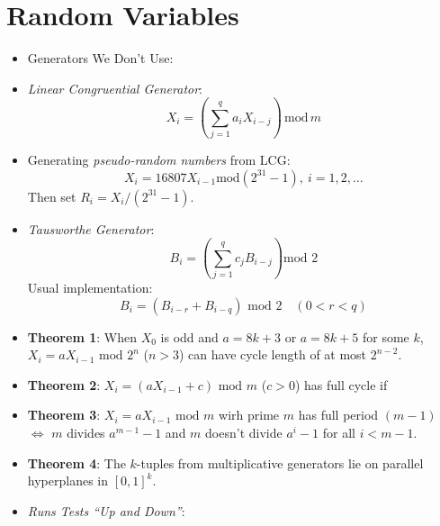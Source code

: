 \documentclass[10pt, twocolumn]{article}
\begin{document}
\section*{Random Variables}
\begin{itemize}
\item Generators We Don't Use: 
\item \emph{Linear Congruential Generator}: 
\[ X_i=(\sum_{j=1}^qa_iX_{i-j})\,\text{mod}\,m \]
\item Generating \emph{pseudo-random numbers} from LCG: 
\[ X_i=16807X_{i-1}\text{mod}(2^{31}-1),\ i=1,2,\dots \]
Then set $R_i=X_i/(2^{31}-1)$.
\item \emph{Tausworthe Generator}:
\[ B_i = \left(\sum_{j=1}^qc_jB_{i-j}\right) \text{mod } 2 \]
Usual implementation: 
\[ B_i = (B_{i-r} + B_{i-q}) \text{ mod } 2 \quad (0<r<q) \]
\item \textbf{Theorem 1}: When $X_0$ is odd and $a=8k+3$ or $a=8k+5$ for some $k$, $X_i=aX_{i-1}\text{ mod }2^n$ ($n>3$) can have cycle length of at most $2^{n-2}$.
\item \textbf{Theorem 2}: $X_i=(aX_{i-1}+c)\text{ mod }m$ ($c>0$) has full cycle if 
\item \textbf{Theorem 3}: $X_i=aX_{i-1}\text{ mod }m$ wirh prime $m$ has full period $(m-1)$ $\Leftrightarrow$ $m$ divides $a^{m-1}-1$ and $m$ doesn't divide $a^i-1$ for all $i<m-1$.
\item \textbf{Theorem 4}: The $k$-tuples from multiplicative generators lie on parallel hyperplanes in $[0,1]^k$.
\item \emph{Runs Tests ``Up and Down''}: %

\end{itemize}
\end{document}
